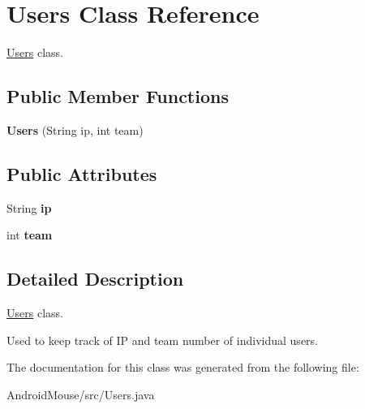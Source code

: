\hypertarget{class_users}{}\section{Users Class Reference}
\label{class_users}


\hyperlink{class_users}{Users} class.  


\subsection*{Public Member Functions}
\begin{DoxyCompactItemize}
\item 
{\bfseries Users} (String ip, int team)\hypertarget{class_users_a5da8355fe6af294477914f55271a1fb5}{}\label{class_users_a5da8355fe6af294477914f55271a1fb5}

\end{DoxyCompactItemize}
\subsection*{Public Attributes}
\begin{DoxyCompactItemize}
\item 
String {\bfseries ip}\hypertarget{class_users_a451f187d7cf746ea23161eebba077408}{}\label{class_users_a451f187d7cf746ea23161eebba077408}

\item 
int {\bfseries team}\hypertarget{class_users_ae8934893539c13c7eee3a7e8385a5f55}{}\label{class_users_ae8934893539c13c7eee3a7e8385a5f55}

\end{DoxyCompactItemize}


\subsection{Detailed Description}
\hyperlink{class_users}{Users} class. 

Used to keep track of IP and team number of individual users. 

The documentation for this class was generated from the following file\+:\begin{DoxyCompactItemize}
\item 
Android\+Mouse/src/Users.\+java\end{DoxyCompactItemize}
